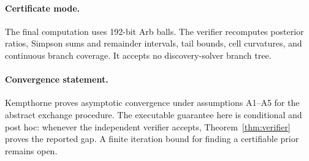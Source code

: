 \paragraph{Certificate mode.}
The final computation uses 192-bit Arb balls.  The verifier recomputes
posterior ratios, Simpson sums and remainder intervals, tail bounds, cell
curvatures, and continuous branch coverage.  It accepts no discovery-solver
branch tree.

\paragraph{Convergence statement.}
Kempthorne \cite[Theorem 3.1]{kempthorne1987} proves asymptotic convergence
under assumptions A1--A5 for the abstract exchange procedure.  The executable
guarantee here is conditional and post hoc: whenever the independent verifier
accepts, Theorem~\ref{thm:verifier} proves the reported gap.  A finite
iteration bound for finding a certifiable prior remains open.
